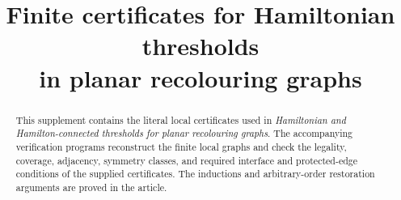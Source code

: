 \documentclass[11pt]{article}
\title{Finite certificates for Hamiltonian thresholds\\in planar recolouring graphs}
\author{}
\date{}
\numberwithin{equation}{section}
\numberwithin{table}{section}
\begin{document}
\maketitle
\begin{abstract}
This supplement contains the literal local certificates used in
\emph{Hamiltonian and Hamilton-connected thresholds for planar recolouring graphs}.
The accompanying verification programs reconstruct the finite local graphs and
check the legality, coverage, adjacency, symmetry classes, and required
interface and protected-edge conditions of the supplied certificates. The
inductions and arbitrary-order restoration arguments are proved in the article.
\end{abstract}
\appendix

\end{document}
